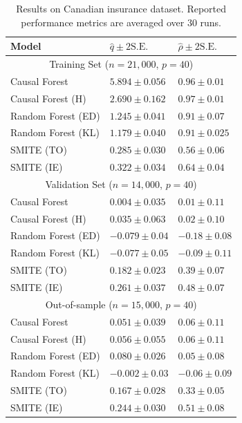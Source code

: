 \begin{table}[]
    \caption{Results on Canadian insurance dataset. Reported performance metrics are averaged over $30$ runs. }
    \centering
    \begin{tabular}{|p{2.9cm}||p{2.1cm}|p{1.8cm}|}
         \hline
         Model &  $\hat{q} \pm 2\mathrm{S.E.}$ & $\hat{\rho} \pm 2\mathrm{S.E.}$\\
         \hline
         \multicolumn{3}{|c|}{Training Set ($n=21,000$, $p=40$)} \\
         \hline
         Causal Forest   & $5.894 \pm 0.056$ & $0.96 \pm 0.01$\\
         Causal Forest (H) & $2.690 \pm 0.162$ & $0.97 \pm 0.01$\\
         Random Forest (ED) & $1.245 \pm 0.041$ & $0.91 \pm 0.07$\\
         Random Forest (KL) & $1.179 \pm 0.040$ & $0.91 \pm 0.025$\\
         SMITE (TO) & $0.285 \pm 0.030$ & $0.56 \pm 0.06$ \\
         SMITE (IE) & $0.322 \pm 0.034$ & $0.64 \pm 0.04$\\
         \hline
         \multicolumn{3}{|c|}{Validation Set ($n=14,000$, $p=40$)} \\
         \hline
         Causal Forest   & $0.004 \pm 0.035$ & $0.01 \pm 0.11$\\
         Causal Forest (H) & $0.035 \pm 0.063$ & $0.02 \pm 0.10$ \\
         Random Forest (ED) & $-0.079 \pm 0.04$ & $-0.18 \pm 0.08$\\
         Random Forest (KL) & $-0.077 \pm 0.05$ & $-0.09 \pm 0.11 $\\
         SMITE (TO) & $0.182 \pm  0.023$ & $0.39 \pm 0.07$\\
         SMITE (IE) & $\mathbf{0.261} \pm 0.037$ & $\mathbf{0.48} \pm 0.07$\\
         \hline
         \multicolumn{3}{|c|}{Out-of-sample ($n=15,000$, $p=40$)} \\
         \hline
         Causal Forest   & $0.051 \pm 0.039$ & $0.06 \pm 0.11$ \\
         Causal Forest (H) & $0.056 \pm 0.055$ & $0.06 \pm 0.11$\\
         Random Forest (ED) & $0.080 \pm 0.026$ & $0.05 \pm 0.08$\\
         Random Forest (KL) & $-0.002 \pm 0.03$ & $-0.06 \pm 0.09$\\
         SMITE (TO) & $0.167 \pm 0.028$ & $0.33 \pm 0.05 $\\
         SMITE (IE) & $\mathbf{0.244} \pm 0.030$ & $\mathbf{0.51}  \pm 0.08$ \\
         \hline
    \end{tabular}
    \label{tab:realdata_perf}
\end{table}